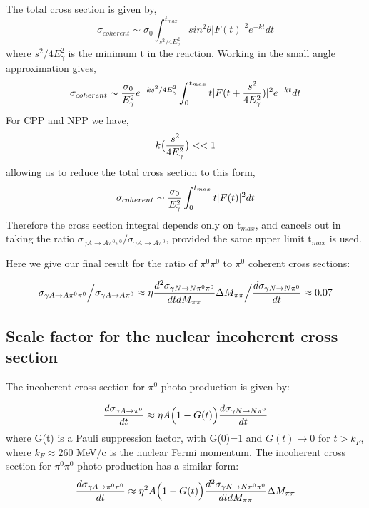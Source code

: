   The total cross section is given by, 
  $$ \sigma_{coherent} \sim \sigma_0 \int^{t_{max}}_{s^2/4E^2_{\gamma}} sin^2 \theta |F(t)|^2 e^{-kt} dt$$ 
  where $s^2/4E^2_\gamma$ is the minimum t in the reaction. 
  Working in the small angle approximation
  gives, 
  $$ \sigma_{coherent} \sim {\sigma_0 \over E^2_\gamma}
  e^{-ks^2/4E^2_\gamma} \int^{t_{max}}_0 t | F(t+{s^2 \over 4 E^2_\gamma})|^2 e^{-kt}dt  $$ 
 For CPP and NPP we have,
 $$k\big( {s^2 \over 4 E^2_\gamma} \big) <<1$$
 allowing us to reduce the total cross section  to this form, 
  $$ \sigma_{coherent} \sim {\sigma_0 \over E^2_\gamma}
  \int^{t_{max}}_0 t | F(t)|^2 dt  $$ 
  Therefore the cross section integral depends only on t$_{max}$, and cancels out in taking the ratio
  $\sigma_{\gamma A \rightarrow A \pi^0 \pi^0}   \Big/  \sigma_{\gamma A \rightarrow A \pi^0} $, provided the same upper limit t$_{max}$ is used. 
  
  Here we give our final result for the ratio of  $\pi^0 \pi^0$ to $\pi^0$  coherent cross sections:

$$  \sigma_{\gamma A \rightarrow A \pi^0 \pi^0}   \Big/  \sigma_{\gamma A \rightarrow A \pi^0}  \approx \eta 
 {d^2\sigma_{\gamma N \rightarrow N \pi^0 \pi^0} \over dt dM_{\pi \pi} } \Delta M_{\pi \pi} \Big/ { d\sigma_{\gamma N \rightarrow N \pi^0} \over dt} \approx 0.07 $$

\subsection{Scale factor for the nuclear incoherent cross section}

The incoherent cross section for  $\pi^0$ photo-production is given by: 

$$ {d\sigma_{\gamma A \rightarrow   \pi^0 } \over dt } \approx \eta A \Big(1 -G(t) \Big){ d\sigma_{\gamma N \rightarrow N \pi^0 } \over dt } $$
where G(t) is a Pauli suppression factor, with G(0)=1 and $G(t)\rightarrow 0$ for $t> k_F$, where $k_F\approx 260$ MeV/c is the nuclear Fermi momentum. The incoherent cross section for  $\pi^0 \pi^0$ photo-production has a similar form: 
$$ {d\sigma_{\gamma A \rightarrow   \pi^0 \pi^0 } \over dt } \approx \eta^2 A \Big(1 -G(t) \Big){ d^2\sigma_{\gamma N \rightarrow N \pi^0 \pi^0 } \over dt dM_{\pi \pi}} \Delta M_{\pi \pi} $$

